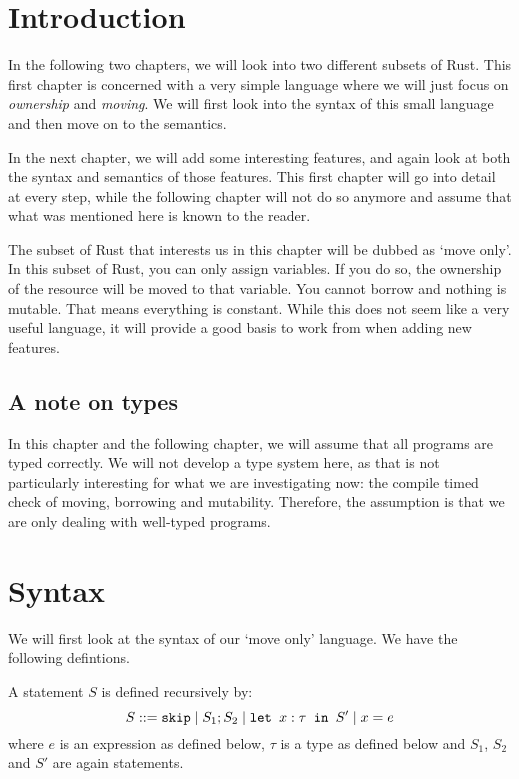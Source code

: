 \section{Introduction}
In the following two chapters, we will look into two different subsets of Rust. This first chapter is concerned with a very simple language where we will just focus on \emph{ownership} and \emph{moving}. We will first look into the syntax of this small language and then move on to the semantics. 

In the next chapter, we will add some interesting features, and again look at both the syntax and semantics of those features. This first chapter will go into detail at every step, while the following chapter will not do so anymore and assume that what was mentioned here is known to the reader.

The subset of Rust that interests us in this chapter will be dubbed as `move only'. In this subset of Rust, you can only assign variables. If you do so, the ownership of the resource will be moved to that variable. You cannot borrow and nothing is mutable. That means everything is constant. While this does not seem like a very useful language, it will provide a good basis to work from when adding new features.

\subsection{A note on types}
In this chapter and the following chapter, we will assume that all programs are typed correctly. We will not develop a type system here, as that is not particularly interesting for what we are investigating now: the compile timed check of moving, borrowing and mutability. Therefore, the assumption is that we are only dealing with well-typed programs. 

\section{Syntax}
We will first look at the syntax of our `move only' language. We have the following defintions.

\begin{definition}
\label{statementsmove}
A statement $S$ is defined recursively by:
$$S ::= \texttt{skip} \mid S_1; S_2 \mid \texttt{let }x : \tau \texttt{ in } S' \mid x = e$$
where $e$ is an expression as defined below, $\tau$ is a type as defined below and $S_1$, $S_2$ and $S'$ are again statements.
\end{definition}

